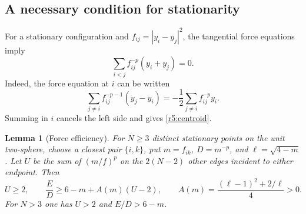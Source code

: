 \documentclass[12pt,reqno]{amsart}
\newtheorem{lemma}[theorem]{Lemma}
\theoremstyle{definition}
\numberwithin{equation}{section}
\begin{document}
\subsection{A necessary condition for stationarity}
For a stationary configuration and $f_{ij}=|y_i-y_j|^2$, the tangential
force equations imply
\begin{equation}\label{r5:centroid}
 \sum_{i<j}f_{ij}^{-p}(y_i+y_j)=0.
\end{equation}
Indeed, the force equation at $i$ can be written
\[
 \sum_{j\ne i}f_{ij}^{-p-1}(y_j-y_i)
      =-\frac12\sum_{j\ne i}f_{ij}^{-p}y_i.
\]
Summing in $i$ cancels the left side and gives \eqref{r5:centroid}.

\begin{lemma}[Force efficiency]\label{r6:force}
For $N\ge3$ distinct stationary points on the unit two-sphere, choose a
closest pair $\{i,k\}$, put $m=f_{ik}$, $D=m^{-p}$, and
$\ell=\sqrt{4-m}$. Let $U$ be the sum of $(m/f)^p$ on the $2(N-2)$ other
edges incident to either endpoint. Then
\begin{equation}\label{r6:forcebound}
 U\ge2,\qquad \frac ED\ge6-m+A(m)(U-2),\qquad
 A(m)=\frac{(\ell-1)^2+2/\ell}{4}>0.
\end{equation}
For $N>3$ one has $U>2$ and $E/D>6-m$.
\end{lemma}
\end{document}
